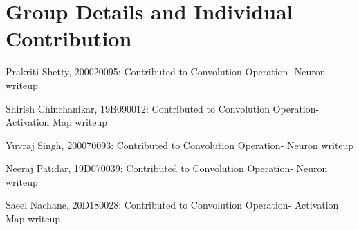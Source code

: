 \documentclass[11pt, twosides]{article}
\begin{document}
\section{Group Details and Individual Contribution}
\item Prakriti Shetty, 200020095: Contributed to Convolution Operation- Neuron writeup
\item Shirish Chinchanikar, 19B090012: Contributed to Convolution Operation- Activation Map writeup
\item Yuvraj Singh, 200070093: Contributed to Convolution Operation- Neuron writeup
\item Neeraj Patidar, 19D070039: Contributed to Convolution Operation- Neuron writeup
\item Saeel Nachane, 20D180028: Contributed to Convolution Operation- Activation Map writeup
\end{document}
